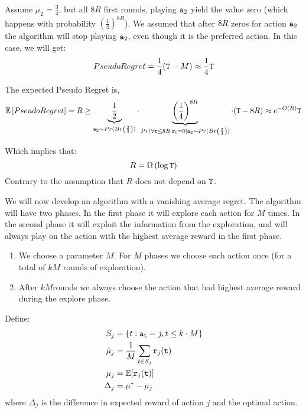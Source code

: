 Assume $\mu_2 = \frac{3}{4}$, but all $8R$ first rounds, playing
${\tt a}_2$ yield the value zero (which happens with probability
$\left(\frac{1}{4}\right)^{8R}$). We assumed that after $8R$ zeros
for action ${\tt a}_2$ the algorithm will stop playing ${\tt a}_2$, even though
it is the preferred action. In this case, we will get:
\[
Pseudo Regret = \frac{1}{4} ({\tt T} - M) \approx \frac{1}{4}{\tt T}
\]

The expected Pseudo Regret is,
\[
\mathbb{E}\left[Pseudo Regret\right] = R \geq
\underbrace{\frac{1}{2}}_{{\tt a}_{2}\sim Pr(Br\left(\frac{3}{4}\right))}
\cdot \underbrace{\left(\frac{1}{4}\right)^{8R}}_{Pr(\forall {\tt t}\leq 8R \; {\tt r}_{\tt t}= 0 |
{\tt a}_{2}\sim Pr(Br\left(\frac{3}{4}\right))} \cdot ({\tt T} - 8R) \approx
e^{-O(R)}{\tt T}
\]

Which implies that:
\[
R=\Omega\left(\log {\tt T}\right)
\]
Contrary to the assumption that $R$ does not depend on ${\tt T}$.


We will now develop an algorithm with a vanishing average regret. The algorithm will have two phases. In the first phase it will explore each action for $M$ times. In the second phase it will exploit the information from the exploration, and will always play on the action with the highest average reward in the first phase.

\begin{enumerate}
%
\item We choose a parameter $M$.
%
For $M$ phases we choose each action once (for a total of $kM$
rounds of exploration).
%
\item After $kM$rounds we always choose the action that had highest
average reward during the explore phase.
\end{enumerate}

Define:
\begin{align*}
S_{j}&= \left\{ t:{\tt a}_{{\tt t}}=j,t\le k\cdot M\right\}\\
\hat{\mu}_{j}&=\frac{1}{M} \sum_{t\in S_{j}}{\tt r}_{j}({\tt t})\\
\mu_{j}&=\mathbb{E}[{\tt r}_{j}({\tt t})]\\
\Delta_{j}&=\mu^{*}-\mu_{j}
\end{align*}
where $\Delta_j$ is the difference in expected reward of action $j$
and the optimal action.

